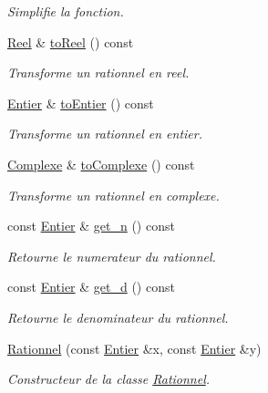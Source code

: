 \begin{DoxyCompactItemize}
\begin{DoxyCompactList}\small\item\em \-Simplifie la fonction. \end{DoxyCompactList}\item 
\hyperlink{class_l_o21_1_1_reel}{\-Reel} \& \hyperlink{class_l_o21_1_1_rationnel_ae99865dd4a35cd635e2918c120cc71cb}{to\-Reel} () const 
\begin{DoxyCompactList}\small\item\em \-Transforme un rationnel en reel. \end{DoxyCompactList}\item 
\hyperlink{class_l_o21_1_1_entier}{\-Entier} \& \hyperlink{class_l_o21_1_1_rationnel_acc531bade32af7c76f84b5ab150c0408}{to\-Entier} () const 
\begin{DoxyCompactList}\small\item\em \-Transforme un rationnel en entier. \end{DoxyCompactList}\item 
\hyperlink{class_l_o21_1_1_complexe}{\-Complexe} \& \hyperlink{class_l_o21_1_1_rationnel_af868bb26a890f1a8eff86feb2c2ca866}{to\-Complexe} () const 
\begin{DoxyCompactList}\small\item\em \-Transforme un rationnel en complexe. \end{DoxyCompactList}\item 
const \hyperlink{class_l_o21_1_1_entier}{\-Entier} \& \hyperlink{class_l_o21_1_1_rationnel_a5442e6750fee7814eec132283965eef7}{get\-\_\-n} () const 
\begin{DoxyCompactList}\small\item\em \-Retourne le numerateur du rationnel. \end{DoxyCompactList}\item 
const \hyperlink{class_l_o21_1_1_entier}{\-Entier} \& \hyperlink{class_l_o21_1_1_rationnel_abffbfed0e03c7b0a560534cdeccfda89}{get\-\_\-d} () const 
\begin{DoxyCompactList}\small\item\em \-Retourne le denominateur du rationnel. \end{DoxyCompactList}\item 
\hyperlink{class_l_o21_1_1_rationnel_a0fb60948285eb5e4bdde460b0ca52ac9}{\-Rationnel} (const \hyperlink{class_l_o21_1_1_entier}{\-Entier} \&x, const \hyperlink{class_l_o21_1_1_entier}{\-Entier} \&y)
\begin{DoxyCompactList}\small\item\em \-Constructeur de la classe \hyperlink{class_l_o21_1_1_rationnel}{\-Rationnel}. \end{DoxyCompactList}\item 

\end{DoxyCompactItemize}
